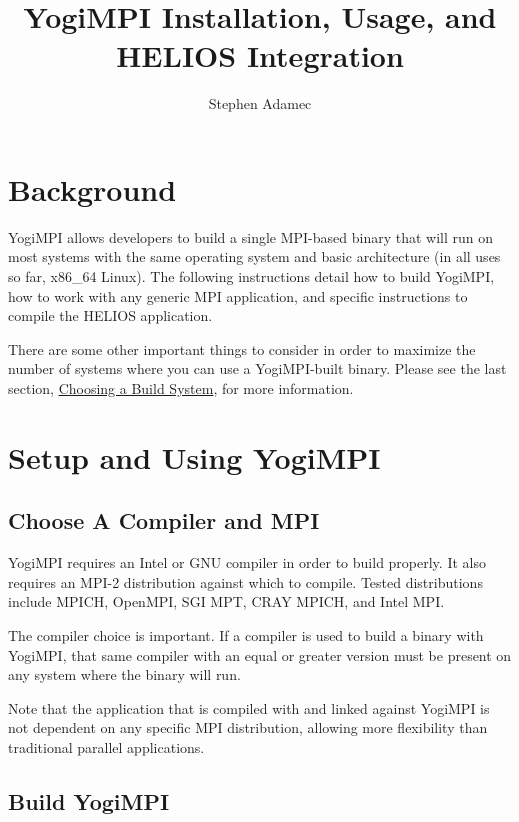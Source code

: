 \documentclass{article}
\begin{document}
\title{YogiMPI Installation, Usage, and HELIOS Integration}
\author{Stephen Adamec}

\maketitle

\section{Background}

YogiMPI allows developers to build a single MPI-based binary that will run on most systems with the same operating system and basic architecture (in all uses so far, x86\_64 Linux).  The following instructions detail how to build YogiMPI, how to work with any generic MPI application, and specific instructions to compile the HELIOS application.

There are some other important things to consider in order to maximize the number of systems where you can use a YogiMPI-built binary.  Please see the last section, \hyperref[choosebuild]{Choosing a Build System}, for more information.

\section{Setup and Using YogiMPI}

\subsection{Choose A Compiler and MPI}
YogiMPI requires an Intel or GNU compiler in order to build properly.  It also requires an MPI-2 distribution against which to compile.  Tested distributions include MPICH, OpenMPI, SGI MPT, CRAY MPICH, and Intel MPI.  

The compiler choice is important.  If a compiler is used to build a binary with YogiMPI, that same compiler with an equal or greater version must be present on any system where the binary will run.

Note that the application that is compiled with and linked against YogiMPI is not dependent on any specific MPI distribution, allowing more flexibility than traditional parallel applications.

\subsection{Build YogiMPI}
\end{document}
